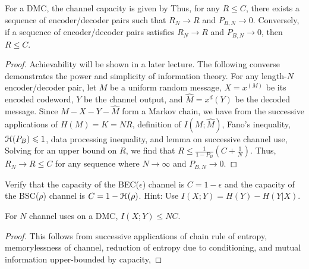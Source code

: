 \documentclass[letterpaper,10pt,english]{article}
\begin{document}
\begin{thm}  
For a DMC, the channel capacity is given by
Thus, for any $R \le C$, there exists a sequence of encoder/decoder pairs such that $R_N \to R$ and $P_{B,N} \to 0$. 
Conversely, if a sequence of encoder/decoder pairs satisfies $R_N \to R$ and $P_{B,N}  \to 0$, then $R \le C$. 
\end{thm}
\begin{proof}
Achievability will be shown in a later lecture. 
The following converse demonstrates the power and simplicity of information theory.
For any length-$N$ encoder/decoder pair, let $M$ be a uniform random message, $X = x^{(M)}$ be its encoded codeword, $Y$ be the channel output, and $\hat{M} = x^{d}(Y)$ be the decoded message. 
Since $M - X - Y - \hat{M}$ form a Markov chain, 
we have from the successive applications of $H(M) = K = NR$, definition of $I(M; \hat{M})$, Fano's inequality, $\mathcal{H}(P_B) \leqslant 1$,  data processing inequality, and lemma on successive channel use, 
Solving for an upper bound on $R$, we find that $R \le \frac{1}{1-P_B}\left(C + \frac{1}{N}\right)$. 
Thus, $R_N \to R \le C$ for any sequence where $N \to \infty$ and $P_{B,N} \to 0$. 
\end{proof}
\begin{exerc} 
Verify that the capacity of the BEC($\epsilon$) channel is $C = 1 -\epsilon$ and the capacity
of the BSC($\rho$) channel is $C=1 -\mathcal{H}(\rho)$. 
Hint: Use $I(X;Y)=H(Y)- H(Y|X)$. 
\end{exerc}
\begin{lem}
For $N$ channel uses on a DMC, $I (X;Y ) \le NC$.
\end{lem}   
\begin{proof}
 This follows from successive applications of chain rule of entropy, memorylessness of channel, reduction of entropy due to conditioning, and mutual information upper-bounded by capacity, 
\end{proof}
\end{document}
